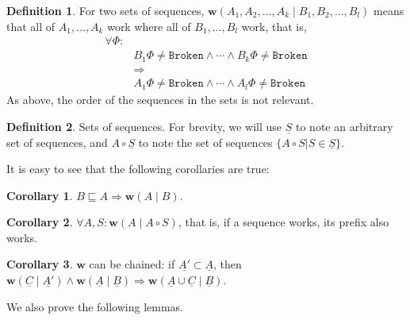 \documentclass[12pt]{article}
\newcommand{\fsbroken}{\mathtt{Broken}} %
\newcommand{\FS}{\Phi} %
\newcommand{\cc}{\circ} %
\newcommand{\eqext}{\sqsubseteq} %
\newcommand{\workssign}{\mathbf{w}}
\newcommand{\worksc}[2]{\workssign({#1}\mathrel{|}{#2})}
\newcommand{\seqset}[1]{\underline{#1}} %
\theoremstyle{definition}
\newtheorem{mydef}{Definition}
\newtheorem{mycor}{Corollary}
\begin{document}
\begin{mydef}
For two sets of sequences, $\worksc{A_1,A_2,\ldots,A_k}{B_1,B_2,\ldots,B_l}$ means that 
all of $A_1,\ldots,A_k$ work where all of $B_1,\ldots,B_l$ work,
that is,
\begin{align*}
\forall \FS:&\\ 
&B_1\FS\neq\fsbroken \wedge \cdots \wedge B_k\FS\neq\fsbroken\\
&\Rightarrow\\
&A_1\FS\neq\fsbroken \wedge \cdots \wedge A_l\FS\neq\fsbroken
\end{align*}
As above, the order of the sequences in the sets is not relevant.
\end{mydef}

\begin{mydef}{Sets of sequences.}
For brevity, we will use $\seqset{S}$ to note an arbitrary set of sequences,
and $A\cc\seqset{S}$ to note the set of sequences $\{A\cc S|S\in\seqset{S}\}$.
\end{mydef}

It is easy to see that the following corollaries are true:


\begin{mycor}
$B\eqext A \Rightarrow \worksc{A}{B}$.
\end{mycor}

\begin{mycor}\label{worksextpostfix}
$\forall A,S: \worksc{A}{A\cc S}$, that is, if a sequence works, its prefix also works.
\end{mycor}

\begin{mycor}\label{workschained}
$\workssign$ can be chained:
if $\seqset{A'}\subset\seqset{A}$, then
$ \worksc{\seqset{C}}{\seqset{A'}} \wedge \worksc{\seqset{A}}{\seqset{B}} \Rightarrow \worksc{\seqset{A}\cup\seqset{C}}{\seqset{B}}$.
\end{mycor}

We also prove the following lemmas.
\end{document}
